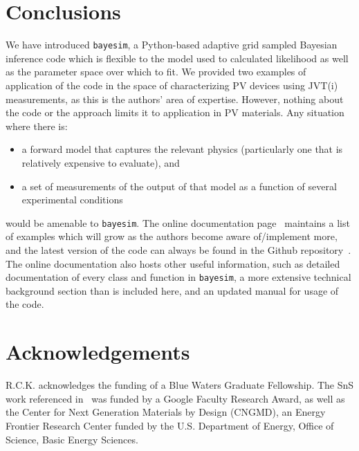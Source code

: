 \documentclass[aps,prl,amsmath,amssymb,superscriptaddress,notitlepage,groupedaddress]{revtex4-1}
\begin{document}
\section*{Conclusions}
 We have introduced \texttt{bayesim}, a Python-based adaptive grid sampled Bayesian inference code which is flexible to the model used to calculated likelihood as well as the parameter space over which to fit. We provided two examples of application of the code in the space of characterizing PV devices using JVT(i) measurements, as this is the authors' area of expertise. However, nothing about the code or the approach limits it to application in PV materials. Any situation where there is:
 \begin{itemize}
   \item a forward model that captures the relevant physics (particularly one that is relatively expensive to evaluate), and
   \item a set of measurements of the output of that model as a function of several experimental conditions
 \end{itemize}
 would be amenable to \texttt{bayesim}. The online documentation page~\cite{docs} maintains a list of examples which will grow as the authors become aware of/implement more, and the latest version of the code can always be found in the Github repository~\cite{gh}. The online documentation also hosts other useful information, such as detailed documentation of every class and function in \texttt{bayesim}, a more extensive technical background section than is included here, and an updated manual for usage of the code.

\section*{Acknowledgements}
R.C.K. acknowledges the funding of a Blue Waters Graduate Fellowship. The SnS work referenced in~\cite{SnSJoule} was funded by a Google Faculty Research Award, as well as the Center for Next Generation Materials by Design (CNGMD), an Energy Frontier Research Center funded by the U.S. Department of Energy, Office of Science, Basic Energy Sciences.



\end{document}

